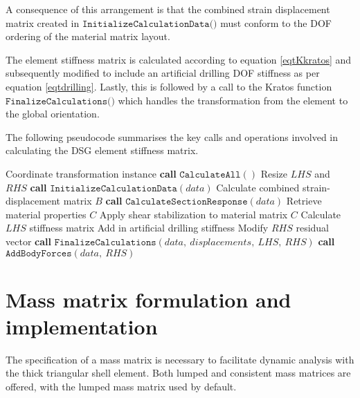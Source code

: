 A consequence of this arrangement is that the combined strain displacement matrix created in $\texttt{InitializeCalculationData()}$ must conform to the DOF ordering of the material matrix layout.

The element stiffness matrix is calculated according to equation \eqref{eqtKkratos} and subsequently modified to include an artificial drilling DOF stiffness as per equation \eqref{eqtdrilling}. Lastly, this is followed by a call to the Kratos function $\texttt{FinalizeCalculations()}$ which handles the transformation from the element to the global orientation.

The following pseudocode summarises the key calls and operations involved in calculating the DSG element stiffness matrix.

\begin{algorithm}
	\onehalfspacing
	\label{DSG triangle element stiffness matrix}
	\begin{algorithmic}[1]
		\Require Coordinate transformation instance
		\State \textbf{call} $\texttt{CalculateAll}()$
		\State Resize $LHS$ and $RHS$
		\State \textbf{call} $\texttt{InitializeCalculationData}(data)$
		\State \hspace{\algorithmicindent}Calculate combined strain-displacement matrix $B$
		\State \textbf{call} $\texttt{CalculateSectionResponse}(data)$
		\State \hspace{\algorithmicindent}Retrieve material properties $C$
		\State \hspace{\algorithmicindent}Apply shear stabilization to material matrix $C$
		\State Calculate $LHS$ stiffness matrix
		\State Add in artificial drilling stiffness
		\State Modify $RHS$ residual vector
		\State \textbf{call} $\texttt{FinalizeCalculations}(data,\ displacements,\ LHS,\ RHS)$
		\State \textbf{call} $\texttt{AddBodyForces}(data,\ RHS)$
	\end{algorithmic}
\end{algorithm}




\section{Mass matrix formulation and implementation}

The specification of a mass matrix is necessary to facilitate dynamic analysis with the thick triangular shell element. Both lumped and consistent mass matrices are offered, with the lumped mass matrix used by default.

